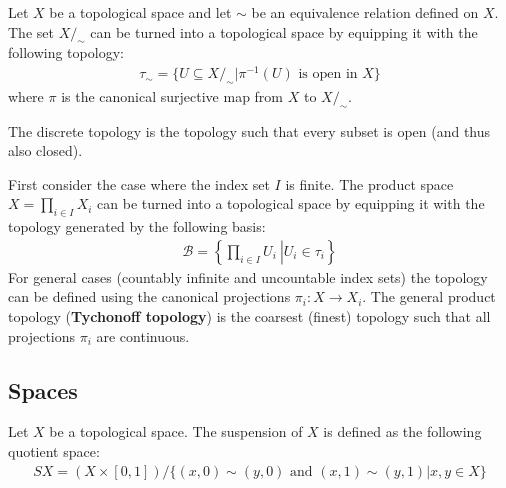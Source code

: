     \begin{example}
        Let $X$ be a topological space and let $\sim$ be an equivalence relation defined on $X$. The set $X/_\sim$ can be turned into a topological space by equipping it with the following topology:
        \begin{gather}
            \label{topology:quotient_space}
            \tau_\sim = \{U\subseteq X/_\sim|\pi^{-1}(U)\text{ is open in }X\}
        \end{gather}
        where $\pi$ is the canonical surjective map from $X$ to $X/_\sim$.
    \end{example}

    \begin{example}
        The discrete topology is the topology such that every subset is open (and thus also closed).
    \end{example}

    \begin{example}\label{topology:tychonoff_topology}
        First consider the case where the index set $I$ is finite. The product space $X = \prod_{i\in I}X_i$ can be turned into a topological space by equipping it with the topology generated by the following basis:
        \begin{gather}
            \mathcal{B} = \left\{\left.\prod_{i\in I}U_i\ \right|U_i\in\tau_i\right\}
        \end{gather}
        For general cases (countably infinite and uncountable index sets) the topology can be defined using the canonical projections $\pi_i:X\rightarrow X_i$. The general product topology (\textbf{Tychonoff topology}) is the coarsest (finest) topology such that all projections $\pi_i$ are continuous.
    \end{example}


\subsection{Spaces}

    \begin{construct}[Suspension]
        Let $X$ be a topological space. The suspension of $X$ is defined as the following quotient space:
        \begin{gather}
            \label{topology:suspension}
            SX =     (X\times [0, 1])/\{(x, 0) \sim (y, 0)\text{ and }(x, 1) \sim (y, 1)|x, y\in X\}
        \end{gather}
    \end{construct}

